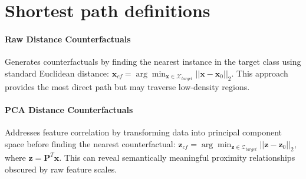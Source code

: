 \documentclass[sigconf,anonymous]{aamas}
\begin{document}
\section{Shortest path definitions}
\paragraph{Raw Distance Counterfactuals}
Generates counterfactuals by finding the nearest instance in the target class using standard Euclidean distance: $\mathbf{x}_{cf} = \arg\min_{\mathbf{x} \in \mathcal{X}_{target}} ||\mathbf{x} - \mathbf{x}_0||_2$. This approach provides the most direct path but may traverse low-density regions.

\paragraph{PCA Distance Counterfactuals}
Addresses feature correlation by transforming data into principal component space before finding the nearest counterfactual: $\mathbf{z}_{cf} = \arg\min_{\mathbf{z} \in \mathcal{Z}_{target}} ||\mathbf{z} - \mathbf{z}_0||_2$, where $\mathbf{z} = \mathbf{P}^T\mathbf{x}$. This can reveal semantically meaningful proximity relationships obscured by raw feature scales.
\end{document}
